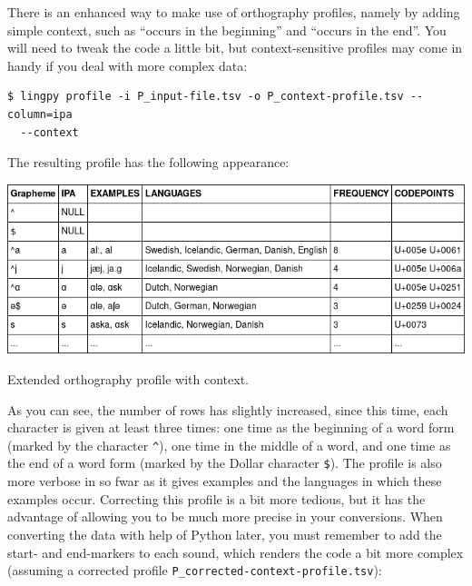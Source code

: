 \documentclass[a4paper,svgnames]{scrartcl}
\begin{document}
There is an enhanced way to make use of orthography profiles, namely by
adding simple context, such as ``occurs in the beginning'' and ``occurs
in the end''. You will need to tweak the code a little bit, but
context-sensitive profiles may come in handy if you deal with more
complex data:

\begin{verbatim}
$ lingpy profile -i P_input-file.tsv -o P_context-profile.tsv --column=ipa 
  --context
\end{verbatim}

The resulting profile has the following appearance:

\begin{table}
\centering
\includegraphics{images/table-12.png}
\caption{Extended orthography profile with context.}
\end{table}

As you can see, the number of rows has slightly increased, since this
time, each character is given at least three times: one time as the
beginning of a word form (marked by the character \texttt{\^{}}), one
time in the middle of a word, and one time as the end of a word form
(marked by the Dollar character \texttt{\$}). The profile is also more
verbose in so fwar as it gives examples and the languages in which these
examples occur. Correcting this profile is a bit more tedious, but it
has the advantage of allowing you to be much more precise in your
conversions. When converting the data with help of Python later, you
must remember to add the start- and end-markers to each sound, which
renders the code a bit more complex (assuming a corrected profile
\texttt{P\_corrected-context-profile.tsv}):
\end{document}
